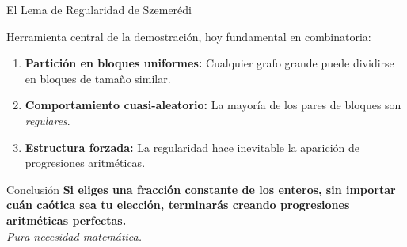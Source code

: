 \begin{frame}{El Lema de Regularidad de Szemerédi}

    Herramienta central de la demostración, hoy fundamental en
    combinatoria:

    \begin{enumerate}
        \item \textbf{Partición en bloques uniformes:} Cualquier
              grafo grande puede dividirse en bloques de tamaño similar.
        \item \textbf{Comportamiento cuasi-aleatorio:} La mayoría
              de los pares de bloques son \textit{regulares}.
        \item \textbf{Estructura forzada:} La regularidad hace
              inevitable la aparición de progresiones aritméticas.
    \end{enumerate}

    \pause
    \vspace{0.35cm}

    \begin{block}{Conclusión}
        \textbf{Si eliges una fracción constante de los enteros,
        sin importar cuán caótica sea tu elección, terminarás
        creando progresiones aritméticas perfectas.}\\[4pt]
        \centering\textit{Pura necesidad matemática.}
    \end{block}

\end{frame}
